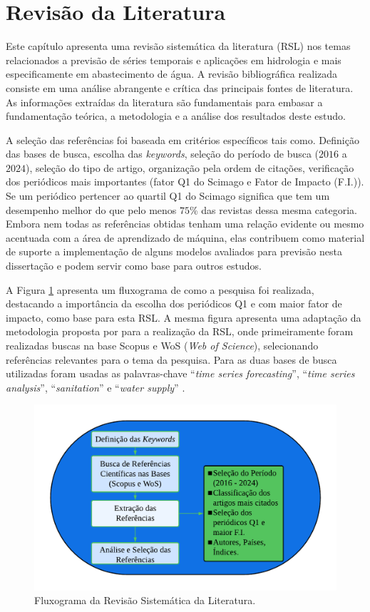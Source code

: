 \section{Revis\~ao da Literatura}\label{sec:refteo}

Este capítulo apresenta uma revisão sistemática  da literatura (RSL) nos temas relacionados a previsão de séries temporais e aplicações em hidrologia e mais especificamente em abastecimento de água. A revisão bibliográfica realizada consiste em uma análise abrangente e crítica das principais fontes de literatura. As informações extraídas da literatura são fundamentais para embasar a fundamentação teórica, a metodologia e a análise dos resultados deste estudo.


A seleção das referências foi baseada em critérios específicos tais como. Definição das bases de busca, escolha das \textit{keywords}, seleção do período de busca ($2016$ a $2024$), seleção do tipo de artigo, organização pela ordem de citações, verificação dos periódicos mais importantes (fator Q1 do Scimago e Fator de Impacto (F.I.)). Se um periódico pertencer ao quartil Q1 do Scimago significa que tem um desempenho melhor do que pelo menos $75$\% das revistas dessa mesma categoria. Embora nem todas as referências obtidas tenham uma relação evidente ou mesmo acentuada com a área de aprendizado de máquina, elas contribuem como material de suporte a implementação de alguns modelos avaliados para previsão nesta dissertação e podem servir como base para outros estudos.

A Figura \ref{fig:serie-temporal} apresenta um fluxograma de como a pesquisa foi realizada, destacando a importância da escolha dos periódicos Q1 e com maior fator de impacto, como base para esta RSL. A mesma figura apresenta uma adaptação da metodologia proposta por  para a realização da RSL, onde primeiramente foram realizadas buscas na base Scopus e WoS (\textit{Web of Science}), selecionando referências relevantes para o tema da pesquisa. Para as duas bases de busca utilizadas foram usadas as palavras-chave ``\textit{time series forecasting}'', ``\textit{time series analysis}'', ``\textit{sanitation}'' e ``\textit{water supply}'' .

\begin{figure}[!htb]
	\centering
	\caption{Fluxograma da Revisão Sistemática da Literatura.}
	\label{fig:serie-temporal}
	\includegraphics[width=0.7\linewidth]{Revisao/Figuras/Figura2.pdf}
\end{figure}

